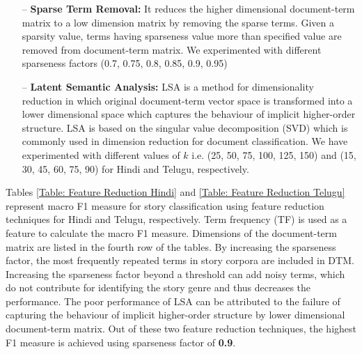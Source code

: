 \documentclass[times, 11pt, a4paper]{article}
\begin{document}
	\begin{itemize}

\item[--] \textbf{Sparse Term Removal:} It reduces the higher dimensional document-term matrix to a low dimension matrix by removing the sparse terms. Given a sparsity value, terms having sparseness value more than specified value are removed from document-term matrix. We experimented with different sparseness factors (0.7, 0.75, 0.8, 0.85, 0.9, 0.95)

\item[--] \textbf{Latent Semantic Analysis:} LSA is a method for dimensionality reduction in which original document-term vector space is transformed into a lower dimensional space which captures the behaviour of implicit higher-order structure. LSA is based on the singular value decomposition (SVD) which is commonly used in dimension reduction for document classification. We have experimented with different values of $k$ i.e. (25, 50, 75, 100, 125, 150) and (15, 30, 45, 60, 75, 90) for Hindi and Telugu, respectively. 

\end{itemize}

Tables \ref{Table: Feature Reduction Hindi} and \ref{Table: Feature Reduction Telugu} represent macro F1 measure for story classification using feature reduction techniques for Hindi and Telugu, respectively. Term frequency (TF) is used as a feature to calculate the macro F1 measure. Dimensions of the document-term matrix are listed in the fourth row of the tables. By increasing the sparseness factor, the most frequently repeated terms in story corpora are included in DTM. Increasing the sparseness factor beyond a threshold can add noisy terms, which do not contribute for identifying the story genre and thus decreases the performance. The poor performance of LSA can be attributed to the failure of capturing the behaviour of implicit higher-order structure by lower dimensional document-term matrix. Out of these two feature reduction techniques, the highest F1 measure is achieved using sparseness factor of \textbf{0.9}. 



\end{document}
